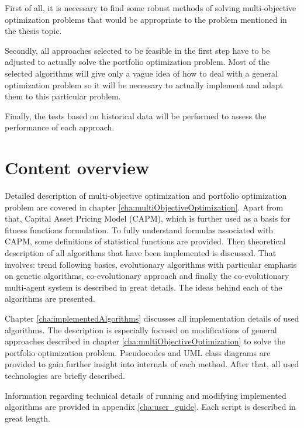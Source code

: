 First of all, it is necessary to find some robust methods of solving multi-objective optimization problems that would be appropriate to the problem mentioned in the thesis topic.

Secondly, all approaches selected to be feasible in the first step have to be adjusted to actually solve the portfolio optimization problem.
Most of the selected algorithms will give only a vague idea of how to deal with a general optimization problem so it will be necessary to actually
 implement and adapt them to this
 particular problem.

Finally, the tests based on historical data will be performed to assess the performance of each approach.


\section{Content overview}
\label{sec:zawartoscPracy}

Detailed description of multi-objective optimization and portfolio optimization problem are covered in chapter \ref{cha:multiObjectiveOptimization}.
Apart from that, Capital Asset Pricing Model (CAPM), which is further used as a basis for fitness functions formulation.
To fully understand formulas associated with CAPM, some definitions of statistical functions are provided.
Then theoretical description of all algorithms that have been implemented is discussed.
That involves: trend following basics, evolutionary algorithms with particular emphasis on genetic algorithms, co-evolutionary approach and finally
the co-evolutionary multi-agent system is described in great details.
The ideas behind each of the algorithms are presented.



Chapter \ref{cha:implementedAlgorithms} discusses all implementation details of used algorithms.
The description is especially focused on modifications of general approaches described in chapter \ref{cha:multiObjectiveOptimization}
 to solve the portfolio optimization problem.
Pseudocodes and UML class diagrams are provided to gain further insight into internals of each method.
After that, all used technologies are briefly described.

Information regarding technical details of running and modifying implemented algorithms are provided in appendix \ref{cha:user_guide}.
Each script is described in great length.

